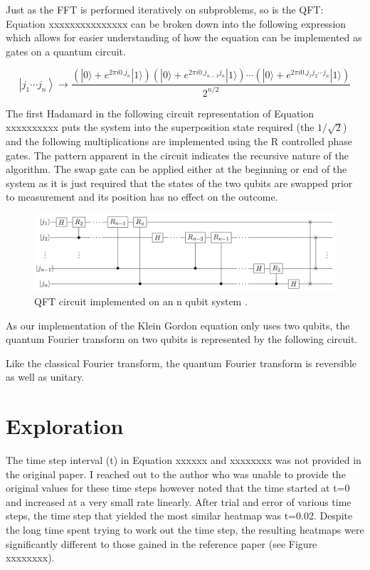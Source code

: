 \documentclass{article}
\begin{document}
Just as the FFT is performed iteratively on subproblems, so is the QFT: Equation xxxxxxxxxxxxxxx can be broken down into the following expression which allows for easier understanding of how the equation can be implemented as gates on a quantum circuit.

\begin{equation}
\left|j_{1} \cdots j_{n}\right\rangle \rightarrow \frac{\left(|0\rangle+ e^{2 \pi i 0 . j_{n}}|1\rangle\right)\left(|0\rangle+ e^{2 \pi i 0 . j_{n-1} j_{n}}|1\rangle\right) \cdots\left(|0\rangle+ e^{2 \pi i 0 . j_{1} j_{2} \cdots j_{n}}|1\rangle\right)}{2^{n / 2}}
\end{equation}

The first Hadamard in the following circuit representation of Equation xxxxxxxxxx puts the system into the superposition state required (the $1/\sqrt{2}$) and the following multiplications are implemented using the R controlled phase gates. The pattern apparent in the circuit indicates the recursive nature of the algorithm. The swap gate can be applied either at the beginning or end of the system as it is just required that the states of the two qubits are swapped prior to measurement and its position has no effect on the outcome.

\begin{figure}[!htb]
\includegraphics[scale=0.35]{../images/qft_circuit}
  \centering
  \caption{QFT circuit implemented on an n qubit system \cite{jurgen}.}
\end{figure}

As our implementation of the Klein Gordon equation only uses two qubits, the quantum Fourier transform on two qubits is represented by the following circuit.


Like the classical Fourier transform, the quantum Fourier transform is reversible as well as unitary.

\section{Exploration}
The time step interval (t) in Equation xxxxxx and xxxxxxxx was not provided in the original paper. I reached out to the author who was unable to provide the original values for these time steps however noted that the time started at t=0 and increased at a very small rate linearly. After trial and error of various time steps, the time step that yielded the most similar heatmap was t=0.02. Despite the long time spent trying to work out the time step, the resulting heatmaps were significantly different to those gained in the reference paper (see Figure xxxxxxxx).
\end{document}
